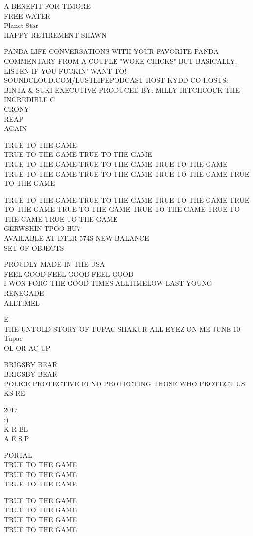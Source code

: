 \documentclass[10pt,letterpaper]{article}
\begin{document}
A BENEFIT FOR TIMORE\\
FREE WATER\\
Planet Star\\
HAPPY RETIREMENT SHAWN

PANDA LIFE CONVERSATIONS WITH YOUR FAVORITE PANDA COMMENTARY FROM A COUPLE "WOKE{-}CHICKS" BUT BASICALLY, LISTEN IF YOU FUCKIN' WANT TO!  SOUNDCLOUD.COM/LUSTLIFEPODCAST HOST KYDD CO{-}HOSTS: BINTA \& SUKI EXECUTIVE PRODUCED BY: MILLY HITCHCOCK THE INCREDIBLE C\\
CRONY\\
REAP\\
AGAIN

TRUE TO THE GAME\\
TRUE TO THE GAME TRUE TO THE GAME\\
TRUE TO THE GAME TRUE TO THE GAME TRUE TO THE GAME\\
TRUE TO THE GAME TRUE TO THE GAME TRUE TO THE GAME TRUE TO THE GAME

TRUE TO THE GAME TRUE TO THE GAME TRUE TO THE GAME TRUE TO THE GAME TRUE TO THE GAME TRUE TO THE GAME TRUE TO THE GAME TRUE TO THE GAME\\
GERWSHIN TPOO HU7\\
AVAILABLE AT DTLR 574S NEW BALANCE\\
SET OF OBJECTS

PROUDLY MADE IN THE USA\\
FEEL GOOD FEEL GOOD FEEL GOOD\\
I WON FORG THE GOOD TIMES ALLTIMELOW LAST YOUNG RENEGADE\\
ALLTIMEL

E\\
THE UNTOLD STORY OF TUPAC SHAKUR ALL EYEZ ON  ME JUNE 10\\
Tupac\\
OL OR AC UP

BRIGSBY BEAR\\
BRIGSBY BEAR\\
POLICE PROTECTIVE FUND PROTECTING THOSE WHO PROTECT US\\
KS RE

2017\\
:)\\
K R BL\\
A E S P

PORTAL\\
TRUE TO THE GAME\\
TRUE TO THE GAME\\
TRUE TO THE GAME

TRUE TO THE GAME\\
TRUE TO THE GAME\\
TRUE TO THE GAME\\
TRUE TO THE GAME
\end{document}
